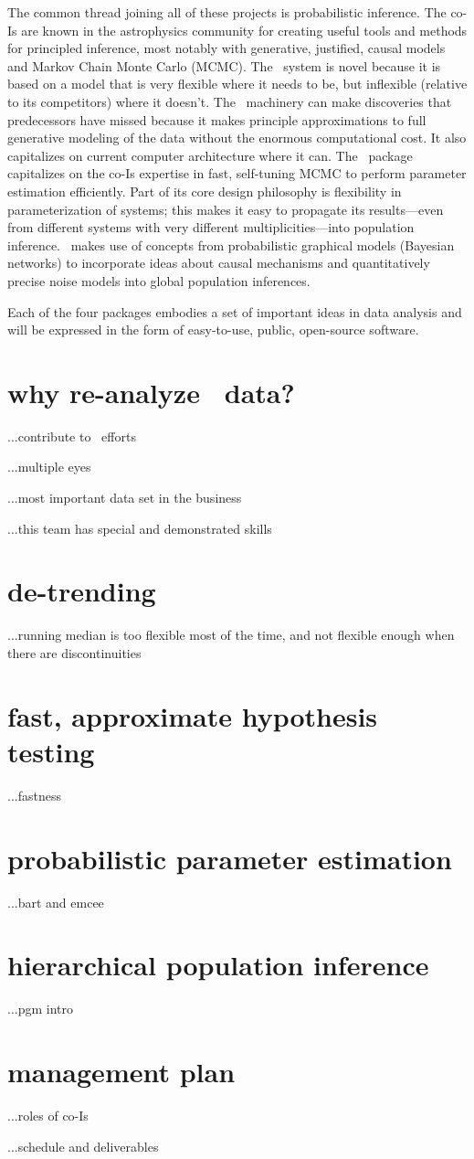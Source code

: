 \documentclass[letterpaper,12pt]{article}
\newcommand{\Untrendy}{\project{Untrendy}}
\newcommand{\turnstyle}{\project{turnstyle}}
\newcommand{\bart}{\project{Bart}}
\newcommand{\TheCreator}{\project{The~Creator}}
\begin{document}
The common thread joining all of these projects is probabilistic
inference.  The co-Is are known in the astrophysics community for
creating useful tools and methods for principled inference, most
notably with generative, justified, causal models and Markov Chain
Monte Carlo (MCMC).  The \Untrendy\ system is novel because it is
based on a model that is very flexible where it needs to be, but
inflexible (relative to its competitors) where it doesn't.  The
\turnstyle\ machinery can make discoveries that predecessors have
missed because it makes principle approximations to full generative
modeling of the data without the enormous computational cost.  It also
capitalizes on current computer architecture where it can.  The
\bart\ package capitalizes on the co-Is expertise in fast, self-tuning
MCMC to perform parameter estimation efficiently.  Part of its core
design philosophy is flexibility in parameterization of systems; this
makes it easy to propagate its results---even from different systems
with very different multiplicities---into population inference.
\TheCreator\ makes use of concepts from probabilistic graphical models
(Bayesian networks) to incorporate ideas about causal mechanisms and
quantitatively precise noise models into global population inferences.

Each of the four packages embodies a set of important ideas in data
analysis and will be expressed in the form of easy-to-use, public,
open-source software.

\section{why re-analyze \Kepler\ data?}

...contribute to \Kepler\ efforts

...multiple eyes

...most important data set in the business

...this team has special and demonstrated skills

\section{de-trending}

...running median is too flexible most of the time, and not flexible enough when there are discontinuities

\section{fast, approximate hypothesis testing}

...fastness

\section{probabilistic parameter estimation}

...bart and emcee

\section{hierarchical population inference}

...pgm intro

\section{management plan}

...roles of co-Is

...schedule and deliverables
\end{document}
